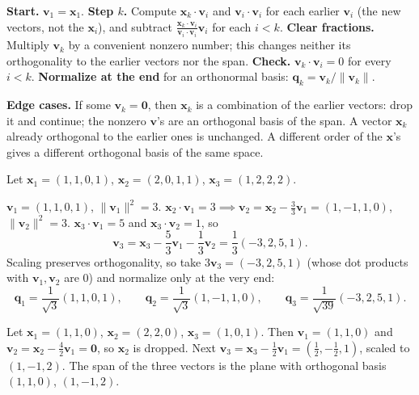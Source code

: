 \documentclass[10pt]{scrartcl}
\newcommand{\vv}[1]{\mathbf{#1}}
\newenvironment{howto}[1]{\begin{mdframed}[style=howtostyle,frametitle={#1}]}{\end{mdframed}}
\begin{document}
\begin{howto}{How to apply the Gram--Schmidt process}
  \begin{steps}
    \ii \textbf{Start.} $\vv v_1=\vv x_1$.
    \ii \textbf{Step $k$.} Compute $\vv x_k\cdot\vv v_i$ and $\vv v_i\cdot\vv v_i$ for each earlier $\vv v_i$ (the new vectors, not the $\vv x_i$), and subtract $\frac{\vv x_k\cdot\vv v_i}{\vv v_i\cdot\vv v_i}\vv v_i$ for each $i<k$.
    \ii \textbf{Clear fractions.} Multiply $\vv v_k$ by a convenient nonzero number; this changes neither its orthogonality to the earlier vectors nor the span.
    \ii \textbf{Check.} $\vv v_k\cdot\vv v_i=0$ for every $i<k$.
    \ii \textbf{Normalize at the end} for an orthonormal basis: $\vv q_k=\vv v_k/\|\vv v_k\|$.
  \end{steps}
  \textbf{Edge cases.} If some $\vv v_k=\vv 0$, then $\vv x_k$ is a combination of the earlier vectors: drop it and continue; the nonzero $\vv v$'s are an orthogonal basis of the span. A vector $\vv x_k$ already orthogonal to the earlier ones is unchanged. A different order of the $\vv x$'s gives a different orthogonal basis of the same space.
\end{howto}

\begin{example*}
  Let $\vv x_1=(1,1,0,1)$, $\vv x_2=(2,0,1,1)$, $\vv x_3=(1,2,2,2)$.
  \begin{steps}
    \ii $\vv v_1=(1,1,0,1)$, $\|\vv v_1\|^2=3$.
    \ii $\vv x_2\cdot\vv v_1=3 \implies \vv v_2=\vv x_2-\frac33\vv v_1=(1,-1,1,0)$, $\|\vv v_2\|^2=3$.
    \ii $\vv x_3\cdot\vv v_1=5$ and $\vv x_3\cdot\vv v_2=1$, so
    \[
      \vv v_3=\vv x_3-\frac53\vv v_1-\frac13\vv v_2 = \frac13(-3,2,5,1).
    \]
    Scaling preserves orthogonality, so take $3\vv v_3=(-3,2,5,1)$ (whose dot products with $\vv v_1,\vv v_2$ are $0$) and normalize only at the very end:
    \[
      \vv q_1=\frac{1}{\sqrt{3}}(1,1,0,1),\qquad
      \vv q_2=\frac{1}{\sqrt{3}}(1,-1,1,0),\qquad
      \vv q_3=\frac{1}{\sqrt{39}}(-3,2,5,1).
    \]
  \end{steps}
\end{example*}

\begin{example*}
  Let $\vv x_1=(1,1,0)$, $\vv x_2=(2,2,0)$, $\vv x_3=(1,0,1)$. Then $\vv v_1=(1,1,0)$ and $\vv v_2=\vv x_2-\frac42\vv v_1=\vv 0$, so $\vv x_2$ is dropped. Next $\vv v_3=\vv x_3-\frac12\vv v_1=(\frac12,-\frac12,1)$, scaled to $(1,-1,2)$. The span of the three vectors is the plane with orthogonal basis $(1,1,0)$, $(1,-1,2)$.
\end{example*}
\end{document}

